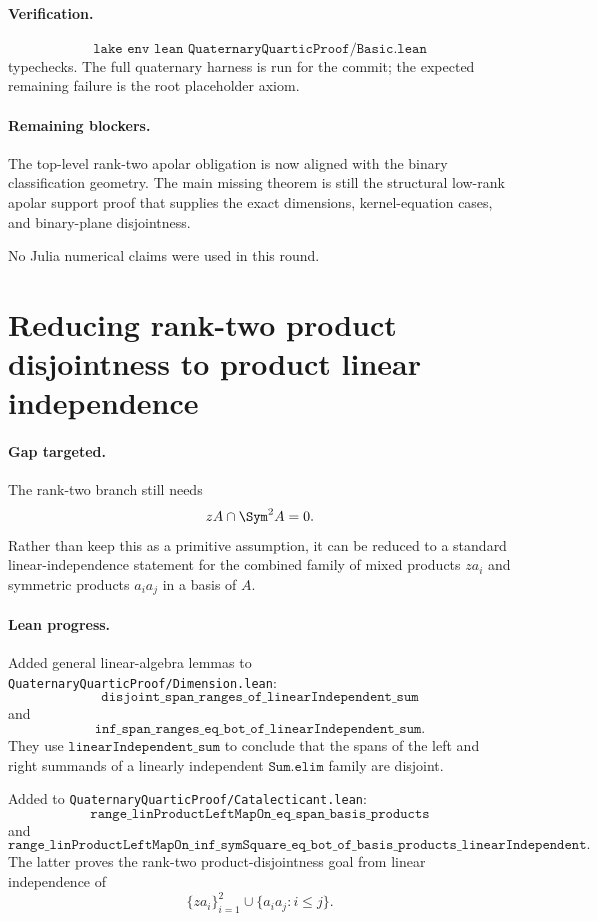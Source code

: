 \documentclass[11pt]{article}
\begin{document}
\paragraph{Verification.}
\[
\texttt{lake env lean QuaternaryQuarticProof/Basic.lean}
\]
typechecks.  The full quaternary harness is run for the commit; the expected
remaining failure is the root placeholder axiom.

\paragraph{Remaining blockers.}
The top-level rank-two apolar obligation is now aligned with the binary
classification geometry.  The main missing theorem is still the structural
low-rank apolar support proof that supplies the exact dimensions,
kernel-equation cases, and binary-plane disjointness.

No Julia numerical claims were used in this round.

\section*{Reducing rank-two product disjointness to product linear independence}

\paragraph{Gap targeted.}
The rank-two branch still needs
\[
zA\cap\Sym^2A=0.
\]
Rather than keep this as a primitive assumption, it can be reduced to a
standard linear-independence statement for the combined family of mixed
products \(z a_i\) and symmetric products \(a_i a_j\) in a basis of \(A\).

\paragraph{Lean progress.}
Added general linear-algebra lemmas to
\texttt{QuaternaryQuarticProof/Dimension.lean}:
\[
\texttt{disjoint\_span\_ranges\_of\_linearIndependent\_sum}
\]
and
\[
\texttt{inf\_span\_ranges\_eq\_bot\_of\_linearIndependent\_sum}.
\]
They use \(\texttt{linearIndependent\_sum}\) to conclude that the spans of the
left and right summands of a linearly independent \(\texttt{Sum.elim}\) family
are disjoint.

Added to \texttt{QuaternaryQuarticProof/Catalecticant.lean}:
\[
\texttt{range\_linProductLeftMapOn\_eq\_span\_basis\_products}
\]
and
\[
\texttt{range\_linProductLeftMapOn\_inf\_symSquare\_eq\_bot\_of\_basis\_products\_linearIndependent}.
\]
The latter proves the rank-two product-disjointness goal from linear
independence of
\[
\{z a_i\}_{i=1}^2\cup\{a_i a_j: i\le j\}.
\]
\end{document}
